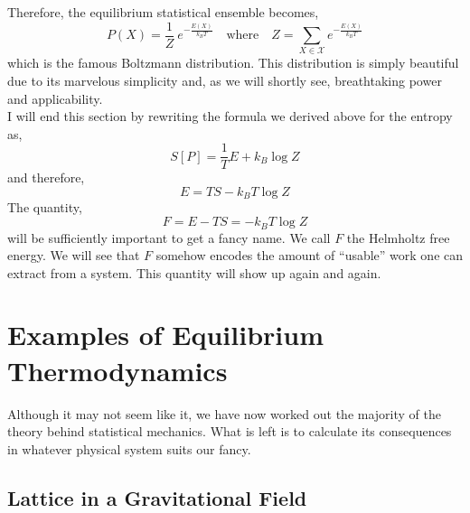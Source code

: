 \documentclass[11pt,a4paper]{article}
\theoremstyle{theorem}
\theoremstyle{definition}
\theoremstyle{definition}
\theoremstyle{remark}
\theoremstyle{definition}
\theoremstyle{remark}
\newcommand{\phase}{\mathscr{X}}
\begin{document}
Therefore, the equilibrium statistical ensemble becomes,
\[ P(X) = \frac{1}{Z} \: e^{-\tfrac{E(X)}{k_B T}} \quad \text{where} \quad Z = \sum_{X \in \phase} e^{-\tfrac{E(X)}{k_B T}} \]
which is the famous Boltzmann distribution. This distribution is simply beautiful due to its marvelous simplicity and, as we will shortly see, breathtaking power and applicability. \bigskip\\
I will end this section by rewriting the formula we derived above for the entropy as,
\[ S[P] = \frac{1}{T} E + k_B \log{Z} \]
and therefore,
\[ E = TS - k_B T \log{Z} \]
The quantity,
\[ F = E - TS = -k_B T \log{Z} \]
will be sufficiently important to get a fancy name. We call $F$ the Helmholtz free energy. We will see that $F$ somehow encodes the amount of ``usable'' work one can extract from a system. This quantity will show up again and again.

\section{Examples of Equilibrium Thermodynamics}

Although it may not seem like it, we have now worked out the majority of the theory behind statistical mechanics. What is left is to calculate its consequences in whatever physical system suits our fancy.

\subsection{Lattice in a Gravitational Field}
\end{document}
